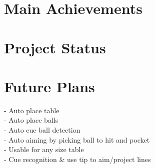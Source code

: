 \documentclass[ %
                author={Finn Alexander Wilkinson},
                supervisor={Dr. Andrew Calway},
                degree={MEng},
                title={\centering A Mixed Reality Aim Assistant for Pool and Snooker},
                subtitle={},
                type={Enterprise},
                year={2021} ]{dissertation}
\begin{document}
\section{Main Achievements}

\section{Project Status}

\section{Future Plans}
 - Auto place table \\
 - Auto place balls \\
 - Auto cue ball detection \\
 - Auto aiming by picking ball to hit and pocket \\
 - Usable for any size table \\
 - Cue recognition \& use tip to aim/project lines \\


%
%

\backmatter





\appendix
\end{document}
